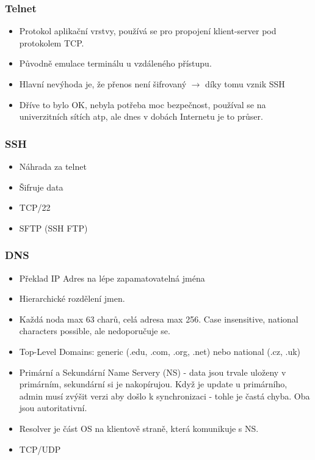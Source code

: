 \documentclass[10pt,a4paper]{article}
\begin{document}
\subsubsection{Telnet}
\begin{itemize}
\item Protokol aplikační vrstvy, používá se pro propojení klient-server pod protokolem TCP.
\item Původně emulace terminálu u vzdáleného přístupu.
\item Hlavní nevýhoda je, že přenos není šifrovaný $\rightarrow$ díky tomu vznik SSH
\item Dříve to bylo OK, nebyla potřeba moc bezpečnost, používal se na univerzitních sítích atp, ale dnes v dobách Internetu je to průser.
\end{itemize}

\subsubsection{SSH}
\begin{itemize}
\item Náhrada za telnet
\item Šifruje data
\item TCP/22
\item SFTP (SSH FTP)
\end{itemize}

\subsubsection{DNS}
\begin{itemize}
\item Překlad IP Adres na lépe zapamatovatelná jména
\item Hierarchické rozdělení jmen.
\item Každá noda max 63 charů, celá adresa max 256. Case insensitive, national characters possible, ale nedoporučuje se.
\item Top-Level Domains: generic (.edu, .com, .org, .net) nebo national (.cz, .uk)
\item Primární a Sekundární Name Servery (NS) - data jsou trvale uloženy v primárním, sekundární si je nakopírujou. Když je update u primárního, admin musí zvýšit verzi aby došlo k synchronizaci - tohle je častá chyba. Oba jsou autoritativní.
\item Resolver je část OS na klientově straně, která komunikuje s NS.
\item TCP/UDP
\end{itemize}
\end{document}
